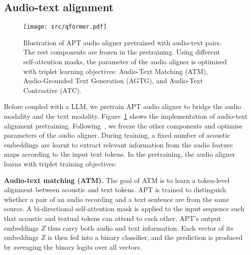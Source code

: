 \documentclass{article} %
\begin{document}


\subsection{Audio-text alignment} \label{appendix:audio-text_alignment}
\begin{figure}[h]
    \centering
    \texttt{[image: src/qformer.pdf]}
    \caption{Illustration of APT audio aligner pretrained with audio-text pairs. The rest components are frozen in the pretraining. Using different self-attention masks, the parameter of the audio aligner is optimised with triplet learning objectives: Audio-Text Matching (ATM), Audio-Grounded Text Generation (AGTG), and Audio-Text Contrastive (ATC).}
    \label{fig.:pretraining}
\end{figure}

Before coupled with a LLM, we pretrain APT audio aligner to bridge the audio modality and the text modality. Figure~\ref{fig.:pretraining} shows the implementation of audio-text alignment pretraining. Following~\cite{li_blip-2_2023}, we freeze the other components and optimise parameters of the audio aligner. During training, a fixed number of acoustic embeddings are learnt to extract relevant information from the audio feature maps according to the input text tokens. In the pretraining, the audio aligner learns with triplet training objectives:

\textbf{Audio-text matching (ATM).} The goal of ATM is to learn a token-level alignment between acoustic and text tokens. APT is trained to distinguish whether a pair of an audio recording and a text sentence are from the same source. A bi-directional self-attention mask is applied to the input sequence such that acoustic and textual tokens can attend to each other. APT's output embeddings $Z$ thus carry both audio and text information. Each vector of its embeddings $Z$ is then fed into a binary classifier, and the prediction is produced by averaging the binary logits over all vectors.
\end{document}
